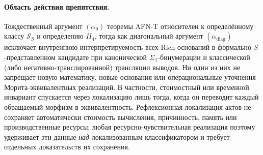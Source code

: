 \documentclass[11pt]{article}
\theoremstyle{plain}
\theoremstyle{definition}
\newcommand{\cS}{\mathcal{S}}
\begin{document}
\paragraph{Область действия препятствия.}
Тождественный аргумент $(\alpha_0)$ теоремы AFN-T относителен к определённому классу $\cS_S$ и определению $\Pi_4$, тогда как диагональный аргумент $(\alpha_{\mathrm{diag}})$ исключает внутреннюю интерпретируемость всех Rich-оснований в формально $S$-представленном кандидате при канонической $\Sigma_1$-бинумерации и классической (либо негативно-транслированной) трансляции выводов. Ни один из них не запрещает новую математику, новые основания или операциональные уточнения Морита-эквивалентных реализаций. В частности, стоимостный или временной инвариант спускается через локализацию лишь тогда, когда он переводит каждый обращаемый морфизм в эквивалентность. Рефлексионная локализация актов не сохраняет автоматически стоимость вычисления, причинность, память или производственные ресурсы; любая ресурсно-чувствительная реализация поэтому удерживает эти данные \emph{над} локализованным классификатором и требует отдельных доказательств их сохранения.
\end{document}
